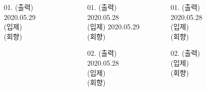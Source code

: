 \documentclass[	20pt, 
							a1paper, 
							portrait, %
							margin=0mm, %
							innermargin=10mm,  		%
							blockverticalspace=4mm, %
							colspace=5mm, 
							subcolspace=0mm
							]{tikzposter}
\begin{document}
\begin{columns}
{\begin{LARGE}
\begin{itemize}
			\end{itemize}
			\end{LARGE}
		}



			{				
			\setlength{\leftmargini}{3em}			
			\setlength{\labelsep}{1em} %

			\begin{LARGE}
			\begin{itemize}
			\item [01.] 	(출력) 2020.05.29 \\
						(입제) \\
						(회향)

			\end{itemize}
			\end{LARGE}
		}





			{				
			\setlength{\leftmargini}{3em}			
			\setlength{\labelsep}{1em} %

			\begin{LARGE}
			\begin{itemize}
			\item [01.] 	(출력) 2020.05.28 \\
						(입제) 2020.05.29 \\
						(회향)
			\item [02.] 	(출력) 2020.05.28 \\
						(입제) \\
						(회향)

			\end{itemize}
			\end{LARGE}
		}


			{				
			\setlength{\leftmargini}{3em}			
			\setlength{\labelsep}{1em} %

			\begin{LARGE}
			\begin{itemize}
			\item [01.] 	(출력) 2020.05.28 \\
						(입제)  \\
						(회향)
			\item [02.] 	(출력) \\
						(입제) \\
						(회향)


\end{itemize}
\end{LARGE}}
\end{columns}
\end{document}
